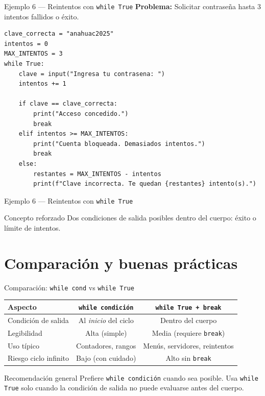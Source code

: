 \documentclass[aspectratio=169,xcolor=dvipsnames]{beamer}
\begin{document}
\begin{frame}[fragile]{Ejemplo 6 --- Reintentos con \texttt{while True}}
    \textbf{Problema:} Solicitar contrase\~na hasta 3 intentos fallidos o \'exito.

\begin{lstlisting}[style=PythonStyle]
clave_correcta = "anahuac2025"
intentos = 0
MAX_INTENTOS = 3
while True:
    clave = input("Ingresa tu contrasena: ")
    intentos += 1

    if clave == clave_correcta:
        print("Acceso concedido.")
        break
    elif intentos >= MAX_INTENTOS:
        print("Cuenta bloqueada. Demasiados intentos.")
        break
    else:
        restantes = MAX_INTENTOS - intentos
        print(f"Clave incorrecta. Te quedan {restantes} intento(s).")
\end{lstlisting}
\end{frame}

\begin{frame}[fragile]{Ejemplo 6 --- Reintentos con \texttt{while True}}
    \begin{exampleblock}{Concepto reforzado}
        Dos condiciones de salida posibles dentro del cuerpo: \'exito o l\'imite de intentos.
    \end{exampleblock}
\end{frame}

\section{Comparaci\'on y buenas pr\'acticas}

\begin{frame}{Comparaci\'on: \texttt{while cond} vs \texttt{while True}}
    \begin{center}
    \begin{tabular}{lcc}
        \toprule
        \textbf{Aspecto} & \texttt{while condici\'on} & \texttt{while True + break} \\
        \midrule
        Condici\'on de salida & Al \textit{inicio} del ciclo & Dentro del cuerpo \\
        Legibilidad          & Alta (simple)               & Media (requiere \texttt{break}) \\
        Uso t\'ipico           & Contadores, rangos          & Men\'us, servidores, reintentos \\
        Riesgo ciclo infinito & Bajo (con cuidado)          & Alto sin \texttt{break} \\
        \bottomrule
    \end{tabular}
    \end{center}

    \vspace{0.3cm}
    \begin{alertblock}{Recomendaci\'on general}
        Prefiere \texttt{while condici\'on} cuando sea posible.
        Usa \texttt{while True} solo cuando la condici\'on de salida no puede evaluarse antes del cuerpo.
    \end{alertblock}
\end{frame}
\end{document}
